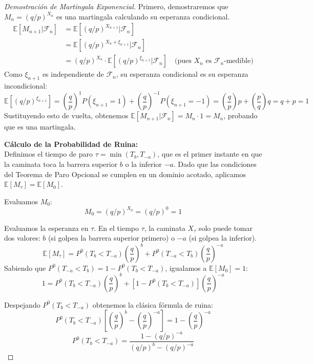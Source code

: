 \documentclass[12pt, a4paper]{article}
\begin{document}
\begin{proof}[Demostración de Martingala Exponencial]
Primero, demostraremos que $M_n = (q/p)^{X_n}$ es una martingala calculando su esperanza condicional.
\begin{align*}
    \mathbb{E}[M_{n+1} | \mathcal{F}_n] &= \mathbb{E}\left[(q/p)^{X_{n+1}} | \mathcal{F}_n\right] \\
    &= \mathbb{E}\left[(q/p)^{X_n + \xi_{n+1}} | \mathcal{F}_n\right] \\
    &= (q/p)^{X_n} \cdot \mathbb{E}\left[(q/p)^{\xi_{n+1}} | \mathcal{F}_n\right] \quad \text{(pues $X_n$ es $\mathcal{F}_n$-medible)}
\end{align*}
Como $\xi_{n+1}$ es independiente de $\mathcal{F}_n$, su esperanza condicional es su esperanza incondicional:
$$ \mathbb{E}\left[(q/p)^{\xi_{n+1}}\right] = \left(\frac{q}{p}\right)^1 P(\xi_{n+1}=1) + \left(\frac{q}{p}\right)^{-1} P(\xi_{n+1}=-1) = \left(\frac{q}{p}\right)p + \left(\frac{p}{q}\right)q = q + p = 1 $$
Sustituyendo esto de vuelta, obtenemos $\mathbb{E}[M_{n+1} | \mathcal{F}_n] = M_n \cdot 1 = M_n$, probando que es una martingala.

\vspace{0.3cm}
\textbf{Cálculo de la Probabilidad de Ruina:} \\
Definimos el tiempo de paro $\tau = \min(T_b, T_{-a})$, que es el primer instante en que la caminata toca la barrera superior $b$ o la inferior $-a$. Dado que las condiciones del Teorema de Paro Opcional se cumplen en un dominio acotado, aplicamos $\mathbb{E}[M_\tau] = \mathbb{E}[M_0]$.

Evaluamos $M_0$:
$$ M_0 = (q/p)^{X_0} = (q/p)^0 = 1 $$

Evaluamos la esperanza en $\tau$. En el tiempo $\tau$, la caminata $X_\tau$ solo puede tomar dos valores: $b$ (si golpea la barrera superior primero) o $-a$ (si golpea la inferior).
$$ \mathbb{E}[M_\tau] = P^0(T_b < T_{-a}) \left(\frac{q}{p}\right)^b + P^0(T_{-a} < T_b) \left(\frac{q}{p}\right)^{-a} $$
Sabiendo que $P^0(T_{-a} < T_b) = 1 - P^0(T_b < T_{-a})$, igualamos a $\mathbb{E}[M_0] = 1$:
$$ 1 = P^0(T_b < T_{-a}) \left(\frac{q}{p}\right)^b + \left[1 - P^0(T_b < T_{-a})\right] \left(\frac{q}{p}\right)^{-a} $$

Despejando $P^0(T_b < T_{-a})$ obtenemos la clásica fórmula de ruina:
$$ P^0(T_b < T_{-a}) \left[ \left(\frac{q}{p}\right)^b - \left(\frac{q}{p}\right)^{-a} \right] = 1 - \left(\frac{q}{p}\right)^{-a} $$
$$ P^0(T_b < T_{-a}) = \frac{1 - (q/p)^{-a}}{(q/p)^b - (q/p)^{-a}} $$
\end{proof}
\end{document}
